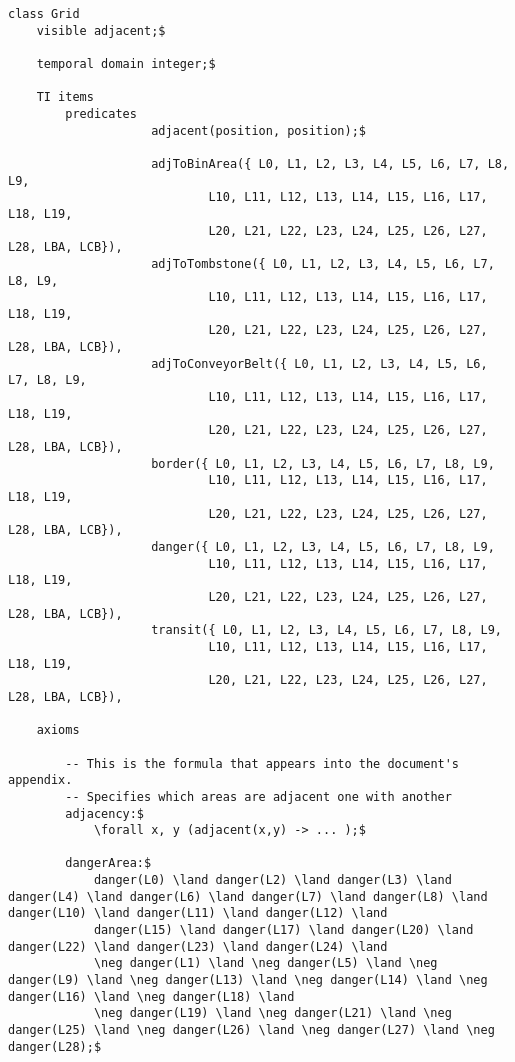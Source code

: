 \begin{lstlisting}[fontadjust, mathescape, frame=tlb] 
class Grid
    visible adjacent;$

    temporal domain integer;$

    TI items
        predicates 
                    adjacent(position, position);$
                    
                    adjToBinArea({ L0, L1, L2, L3, L4, L5, L6, L7, L8, L9,
                            L10, L11, L12, L13, L14, L15, L16, L17, L18, L19,
                            L20, L21, L22, L23, L24, L25, L26, L27, L28, LBA, LCB}),
                    adjToTombstone({ L0, L1, L2, L3, L4, L5, L6, L7, L8, L9,
                            L10, L11, L12, L13, L14, L15, L16, L17, L18, L19,
                            L20, L21, L22, L23, L24, L25, L26, L27, L28, LBA, LCB}),
                    adjToConveyorBelt({ L0, L1, L2, L3, L4, L5, L6, L7, L8, L9,
                            L10, L11, L12, L13, L14, L15, L16, L17, L18, L19,
                            L20, L21, L22, L23, L24, L25, L26, L27, L28, LBA, LCB}),
                    border({ L0, L1, L2, L3, L4, L5, L6, L7, L8, L9,
                            L10, L11, L12, L13, L14, L15, L16, L17, L18, L19,
                            L20, L21, L22, L23, L24, L25, L26, L27, L28, LBA, LCB}),
                    danger({ L0, L1, L2, L3, L4, L5, L6, L7, L8, L9,
                            L10, L11, L12, L13, L14, L15, L16, L17, L18, L19,
                            L20, L21, L22, L23, L24, L25, L26, L27, L28, LBA, LCB}),
                    transit({ L0, L1, L2, L3, L4, L5, L6, L7, L8, L9,
                            L10, L11, L12, L13, L14, L15, L16, L17, L18, L19,
                            L20, L21, L22, L23, L24, L25, L26, L27, L28, LBA, LCB}),

    axioms
        
        -- This is the formula that appears into the document's appendix.
        -- Specifies which areas are adjacent one with another
        adjacency:$ 
            \forall x, y (adjacent(x,y) -> ... );$

        dangerArea:$
            danger(L0) \land danger(L2) \land danger(L3) \land danger(L4) \land danger(L6) \land danger(L7) \land danger(L8) \land danger(L10) \land danger(L11) \land danger(L12) \land 
            danger(L15) \land danger(L17) \land danger(L20) \land danger(L22) \land danger(L23) \land danger(L24) \land 
            \neg danger(L1) \land \neg danger(L5) \land \neg danger(L9) \land \neg danger(L13) \land \neg danger(L14) \land \neg danger(L16) \land \neg danger(L18) \land
            \neg danger(L19) \land \neg danger(L21) \land \neg danger(L25) \land \neg danger(L26) \land \neg danger(L27) \land \neg danger(L28);$
        

\end{lstlisting}
